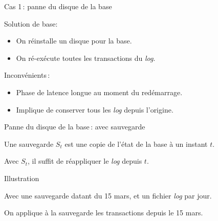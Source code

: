 \begin{frame}{Cas 1\,: panne du disque de la base}

Solution de base: 

       \begin{itemize}
       \item On réinstalle un disque pour la base.
     \item  On ré-exécute toutes les transactions du \textit{log}.
    \end{itemize}


\vfill

\begin{block}{}
Inconvénients\,:
       \begin{itemize}
       \item Phase de latence longue au moment du redémarrage.
     \item Implique de conserver tous les \textit{log} depuis l'origine.
    \end{itemize}

\end{block}
\end{frame}


\begin{frame}{Panne du disque de la base\,: avec sauvegarde}

Une \alert{sauvegarde} $S_t$ est une copie de \alert{l'état de la base} à un instant $t$.

\vfill


\vfill

\begin{block}{}
Avec  $S_t$, il suffit
de réappliquer le  \textit{log} depuis $t$.
\end{block}
\end{frame}


\begin{frame}{Illustration}

Avec une sauvegarde datant du 15 mars, et un fichier \textit{log} par jour.

\vfill


\vfill
\begin{block}{}
On applique à la sauvegarde les transactions depuis le 15 mars.
\end{block}
\end{frame}

